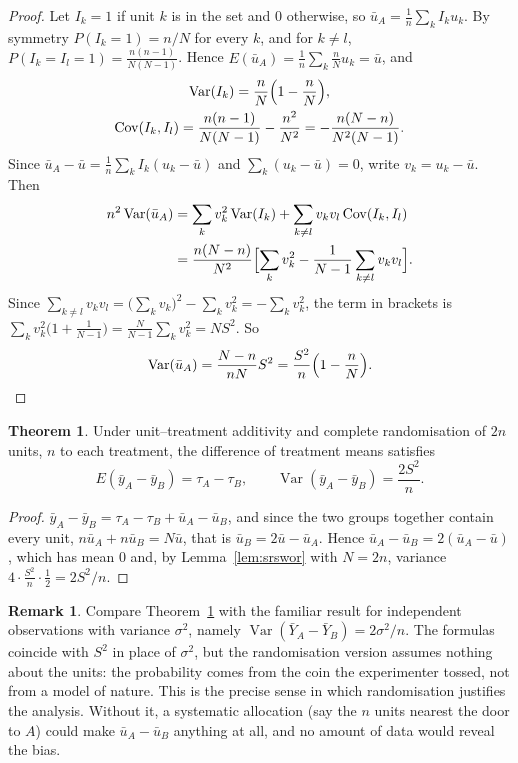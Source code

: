 \documentclass[11pt,a4paper]{article}
\numberwithin{equation}{section}
\DeclareMathOperator{\Var}{Var}
\DeclareMathOperator{\Cov}{Cov}
\theoremstyle{definition}
\newtheorem{thm}{Theorem}[subsection]
\newtheorem*{remark}{Remark}
\begin{document}
\begin{proof}
Let $I_k = 1$ if unit $k$ is in the set and $0$ otherwise, so $\bar u_A = \frac1n\sum_kI_ku_k$. By symmetry $P(I_k = 1) = n/N$ for every $k$, and for
$k \ne l$, $P(I_k = I_l = 1) = \frac{n(n - 1)}{N(N - 1)}$. Hence $E(\bar u_A) = \frac1n\sum_k\frac nNu_k = \bar u$, and
\begin{gather*}
\Var(I_k) = \frac nN\Bigl(1 - \frac nN\Bigr) , \\
\Cov(I_k, I_l) = \frac{n(n - 1)}{N(N - 1)} - \frac{n^2}{N^2} = -\frac{n(N - n)}{N^2(N - 1)} .
\end{gather*}
Since $\bar u_A - \bar u = \frac1n\sum_kI_k(u_k - \bar u)$ and $\sum_k(u_k - \bar u) = 0$, write $v_k = u_k - \bar u$. Then
\begin{align*}
n^2\Var(\bar u_A) &= \sum_kv_k^2\Var(I_k) + \sum_{k\ne l}v_kv_l\Cov(I_k, I_l) \\
&= \frac{n(N - n)}{N^2}\Bigl[\sum_kv_k^2 - \frac{1}{N - 1}\sum_{k\ne l}v_kv_l\Bigr] .
\end{align*}
Since $\sum_{k\ne l}v_kv_l = \bigl(\sum_kv_k\bigr)^2 - \sum_kv_k^2 = -\sum_kv_k^2$, the term in brackets is $\sum_kv_k^2\bigl(1 + \frac{1}{N - 1}\bigr) = \frac{N}{N - 1}\sum_kv_k^2 = NS^2$. So
\[
\Var(\bar u_A) = \frac{N - n}{nN}S^2 = \frac{S^2}{n}\Bigl(1 - \frac nN\Bigr) .
\]
\end{proof}

\begin{thm}\label{thm:randomisation}
Under unit--treatment additivity and complete randomisation of $2n$ units, $n$ to each treatment, the difference of treatment means satisfies
\[
E(\bar y_A - \bar y_B) = \tau_A - \tau_B , \qquad \Var(\bar y_A - \bar y_B) = \frac{2S^2}{n} .
\]
\end{thm}

\begin{proof}
$\bar y_A - \bar y_B = \tau_A - \tau_B + \bar u_A - \bar u_B$, and since the two groups together contain every unit, $n\bar u_A + n\bar u_B = N\bar u$, that
is $\bar u_B = 2\bar u - \bar u_A$. Hence $\bar u_A - \bar u_B = 2(\bar u_A - \bar u)$, which has mean $0$ and, by Lemma~\ref{lem:srswor} with $N = 2n$,
variance $4\cdot\frac{S^2}{n}\cdot\frac12 = 2S^2/n$.
\end{proof}

\begin{remark}
Compare Theorem~\ref{thm:randomisation} with the familiar result for independent observations with variance $\sigma^2$, namely
$\Var(\bar Y_A - \bar Y_B) = 2\sigma^2/n$. The formulas coincide with $S^2$ in place of $\sigma^2$, but the randomisation version assumes nothing about
the units: the probability comes from the coin the experimenter tossed, not from a model of nature. This is the precise sense in which
randomisation justifies the analysis. Without it, a systematic allocation (say the $n$ units nearest the door to $A$) could make $\bar u_A - \bar u_B$
anything at all, and no amount of data would reveal the bias.
\end{remark}
\end{document}
